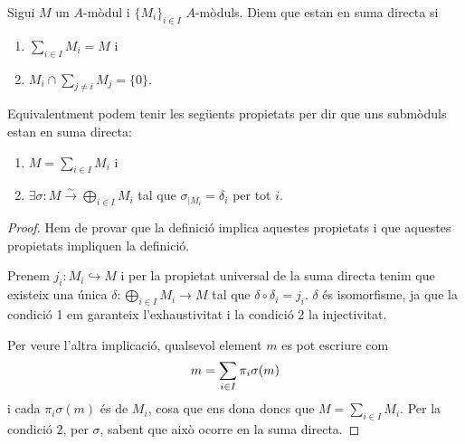 \documentclass[../../../main.tex]{subfiles}
\begin{document}
\begin{defi}
\label{def:sumadirect} Sigui $M$ un $A$-mòdul i $\{M_i\}_{i\in I}$ $A$-mòduls. Diem que estan en suma directa si 
\begin{enumerate}[(1)]
    \item $\sum_{i\in I} M_i = M$ i
    \item $M_i\cap \sum_{j\not=i}M_j = \{0\}$.  
\end{enumerate}
\end{defi}

\begin{prop}
\label{prop:sumadirecta}
Equivalentment podem tenir les següents propietats per dir que uns submòduls estan en suma directa:
\begin{enumerate}[(1)]
    \item $M = \sum_{i\in I}M_i$ i
    \item $\exists \sigma:M\overset{\sim}{\to}\bigoplus_{i\in I} M_i$ tal que $\sigma_{|M_i} = \delta_i$ per tot $i$.
\end{enumerate}
\end{prop}

\begin{proof}
Hem de provar que la definició implica aquestes propietats i que aquestes propietats impliquen la definició.

Prenem $j_i:M_i\hookrightarrow M$ i per la propietat universal de la suma directa tenim que existeix una única $\delta:\bigoplus_{i\in I} M_i\to M$ tal que $\delta\circ\delta_i = j_i$. $\delta$ és isomorfisme, ja que la condició 1 em garanteix l'exhaustivitat i la condició 2 la injectivitat.

Per veure l'altra implicació, qualsevol element $m$ es pot escriure com
\begin{equation}
    \notag
    m = \sum_{i\in I}\pi_i\sigma(m) 
\end{equation}
i cada $\pi_i\sigma(m)$ és de $M_i$, cosa que ens dona doncs que $M = \sum_{i\in I}M_i$. Per la condició 2, per $\sigma$, sabent que això ocorre en la suma directa.
\end{proof}
\end{document}
